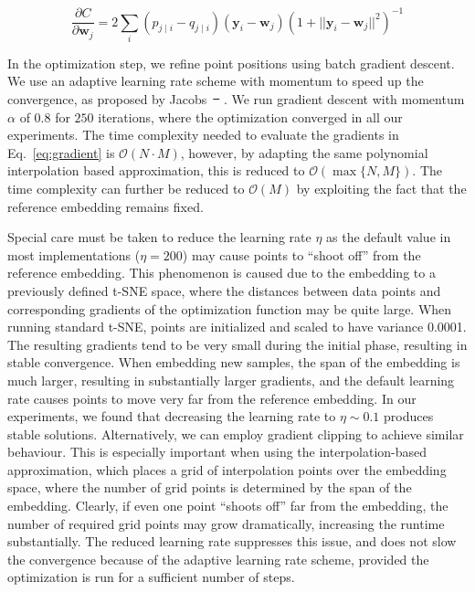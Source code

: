 \documentclass[runningheads]{llncs}
\providecommand{\DIFaddtex}[1]{{\protect\color{blue}\uwave{#1}}} %
\providecommand{\DIFdeltex}[1]{{\protect\color{red}\sout{#1}}}                      %
\providecommand{\DIFaddbegin}{} %
\providecommand{\DIFaddend}{} %
\providecommand{\DIFdelbegin}{} %
\providecommand{\DIFdelend}{} %
\providecommand{\DIFadd}[1]{\texorpdfstring{\DIFaddtex{#1}}{#1}} %
\providecommand{\DIFdel}[1]{\texorpdfstring{\DIFdeltex{#1}}{}} %
\newcommand{\DIFscaledelfig}{0.5}
\newlength{\DIFdelgraphicswidth} %
\newlength{\DIFdelgraphicsheight} %
\newcommand{\DIFaddincludegraphics}[2][]{{\color{blue}\fbox{\DIFOincludegraphics[#1]{#2}}}} %
\newcommand{\DIFdelincludegraphics}[2][]{%
\sbox{\DIFdelgraphicsbox}{\DIFOincludegraphics[#1]{#2}}%
\settoboxwidth{\DIFdelgraphicswidth}{\DIFdelgraphicsbox} %
\settoboxtotalheight{\DIFdelgraphicsheight}{\DIFdelgraphicsbox} %
\scalebox{\DIFscaledelfig}{%
\parbox[b]{\DIFdelgraphicswidth}{\usebox{\DIFdelgraphicsbox}\\[-\baselineskip] \rule{\DIFdelgraphicswidth}{0em}}\llap{\resizebox{\DIFdelgraphicswidth}{\DIFdelgraphicsheight}{%
\setlength{\unitlength}{\DIFdelgraphicswidth}%
\begin{picture}(1,1)%
\thicklines\linethickness{2pt} %
{\color[rgb]{1,0,0}\put(0,0){\framebox(1,1){}}}%
{\color[rgb]{1,0,0}\put(0,0){\line( 1,1){1}}}%
{\color[rgb]{1,0,0}\put(0,1){\line(1,-1){1}}}%
\end{picture}%
}\hspace*{3pt}}} %
} %
\DeclareRobustCommand{\DIFaddbegin}{\DIFOaddbegin \let\includegraphics\DIFaddincludegraphics} %
\DeclareRobustCommand{\DIFaddend}{\DIFOaddend \let\includegraphics\DIFOincludegraphics} %
\DeclareRobustCommand{\DIFdelbegin}{\DIFOdelbegin \let\includegraphics\DIFdelincludegraphics} %
\DeclareRobustCommand{\DIFdelend}{\DIFOaddend \let\includegraphics\DIFOincludegraphics} %
\begin{document}
\begin{equation}
\frac{\partial C}{\partial \mathbf{w}_j} = 2 \sum_i \left ( p_{j \mid i} - q_{j \mid i} \right ) \left ( \mathbf{y}_i - \mathbf{w}_j \right ) \left ( 1 + || \mathbf{y}_i - \mathbf{w}_j || ^2 \right )^{-1}
\label{eq:gradient}
\end{equation}

In the optimization step, we refine point positions using batch gradient
descent. We use an adaptive learning rate scheme with momentum to speed up the
convergence, as proposed by Jacobs~\DIFdelbegin \DIFdel{\mbox{%
\cite{momentum,bh_tsne}}\hspace{0pt}%
}\DIFdelend \DIFaddbegin \DIFadd{\mbox{%
\cite{Jacobs1988,Maaten2014}}\hspace{0pt}%
}\DIFaddend . We run gradient
descent with momentum $\alpha$ of $0.8$ for $250$ iterations, where the
optimization converged in all our experiments. The time complexity needed to
evaluate the gradients in Eq.~\ref{eq:gradient} is $\mathcal{O}(N \cdot M)$,
however, by adapting the same polynomial interpolation based approximation, this
is reduced to $\mathcal{O}(\max \{ N, M \})$. The time complexity can further be
reduced to $\mathcal{O}(M)$ by exploiting the fact that the reference embedding
remains fixed.

Special care must be taken to reduce the learning rate $\eta$ as the default
value in most implementations ($\eta = 200$) may cause points to ``shoot off''
from the reference embedding. This phenomenon is caused due to the embedding to
a previously defined t-SNE space, where the distances between data points and
corresponding gradients of the optimization function may be quite large. When
running standard t-SNE, points are initialized and scaled to have variance
0.0001. The resulting gradients tend to be very small during the initial phase,
resulting in stable convergence. When embedding new samples, the span of the
embedding is much larger, resulting in substantially larger gradients, and the
default learning rate causes points to move very far from the reference
embedding. In our experiments, we found that decreasing the learning rate to
$\eta \sim 0.1$ produces stable solutions. Alternatively, we can employ gradient
clipping to achieve similar behaviour. This is especially important when using
the interpolation-based approximation, which places a grid of interpolation
points over the embedding space, where the number of grid points is determined
by the span of the embedding. Clearly, if even one point ``shoots off'' far from
the embedding, the number of required grid points may grow dramatically,
increasing the runtime substantially. The reduced learning rate suppresses this
issue, and does not slow the convergence because of the adaptive learning rate
scheme, provided the optimization is run for a sufficient number of steps.
\end{document}
